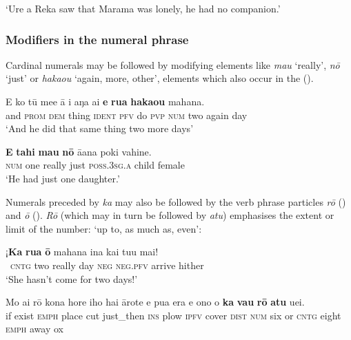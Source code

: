 \glt 
‘Ure a Reka saw that Marama was lonely, he had no companion.’ \textstyleExampleref{[Ley-7-48.013]}
\z

\subsubsection[Modifiers in the numeral phrase]{Modifiers in the numeral phrase}\label{sec:4.3.2.4}

Cardinal numerals may be followed by modifying elements like \textit{mau} ‘really’, \textit{nō} ‘just’ or \textit{haka{\ꞌ}ou} ‘again, more, other’, elements which also occur in the  ().

\ea\label{ex:4.35}
\gll {\ꞌ}E ko tū me{\ꞌ}e {\ꞌ}ā i aŋa ai \textbf{e} \textbf{rua} \textbf{haka{\ꞌ}ou} mahana. \\
and \textsc{prom} \textsc{dem} thing \textsc{ident} \textsc{pfv} do \textsc{pvp} \textsc{num} two again day \\

\glt 
‘And he did that same thing two more days’ \textstyleExampleref{[R532-07.021]}
\z

\ea\label{ex:4.36}
\gll \textbf{E} \textbf{tahi} \textbf{mau} \textbf{nō} {\ꞌ}ā{\ꞌ}ana poki vahine.\\
\textsc{num} one really just \textsc{poss.3sg.a} child female\\

\glt 
‘He had just one daughter.’ \textstyleExampleref{[R372.004]} 
\z

Numerals preceded by \textit{ka} may also be followed by the verb phrase particles \textit{rō} () and \textit{{\ꞌ}ō} (). \textit{Rō} (which may in turn be followed by \textit{atu}) emphasises the extent or limit of the number: ‘up to, as much as, even’:

\ea\label{ex:4.37}
\gll ¡\textbf{Ka} \textbf{rua} \textbf{{\ꞌ}ō} mahana {\ꞌ}ina kai tu{\ꞌ}u mai! \\
~\textsc{cntg} two really day \textsc{neg} \textsc{neg.pfv} arrive hither \\

\glt 
‘She hasn’t come for two days!’ \textstyleExampleref{[R229.132]} 
\z

\ea\label{ex:4.38}
\gll Mo ai rō kona hore iho hai {\ꞌ}ārote e pu{\ꞌ}a era e ono  {\ꞌ}o \textbf{ka} \textbf{va}{\ꞌ}\textbf{u} \textbf{rō} \textbf{atu} {\ꞌ}uei.\\
if exist \textsc{emph} place cut just\_then \textsc{ins} plow \textsc{ipfv} cover \textsc{dist} \textsc{num} six  or \textsc{cntg} eight \textsc{emph} away ox\\

